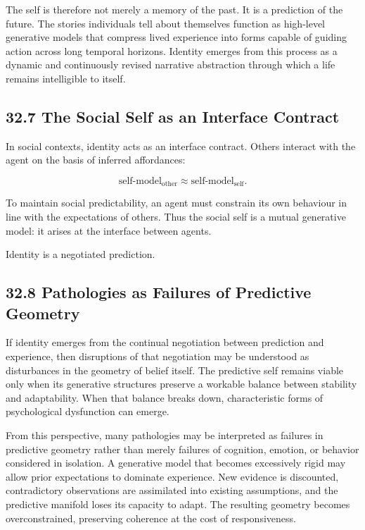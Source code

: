 \documentclass[12pt,letterpaper]{article}
\theoremstyle{remark}
\begin{document}
The self is therefore not merely a memory of the past. It is a prediction of the future. The stories individuals tell about themselves function as high-level generative models that compress lived experience into forms capable of guiding action across long temporal horizons. Identity emerges from this process as a dynamic and continuously revised narrative abstraction through which a life remains intelligible to itself.

\subsection{32.7 The Social Self as an Interface Contract}

In social contexts, identity acts as an interface contract.  
Others interact with the agent on the basis of inferred affordances:

\[
\text{self-model}_{\text{other}} \approx \text{self-model}_{\text{self}}.
\]

To maintain social predictability, an agent must constrain its own behaviour in line with the expectations of others. Thus the social self is a mutual generative model: it arises at the interface between agents.

Identity is a negotiated prediction.

\subsection{32.8 Pathologies as Failures of Predictive Geometry}

If identity emerges from the continual negotiation between prediction and experience, then disruptions of that negotiation may be understood as disturbances in the geometry of belief itself. The predictive self remains viable only when its generative structures preserve a workable balance between stability and adaptability. When that balance breaks down, characteristic forms of psychological dysfunction can emerge.

From this perspective, many pathologies may be interpreted as failures in predictive geometry rather than merely failures of cognition, emotion, or behavior considered in isolation. A generative model that becomes excessively rigid may allow prior expectations to dominate experience. New evidence is discounted, contradictory observations are assimilated into existing assumptions, and the predictive manifold loses its capacity to adapt. The resulting geometry becomes overconstrained, preserving coherence at the cost of responsiveness.
\end{document}

